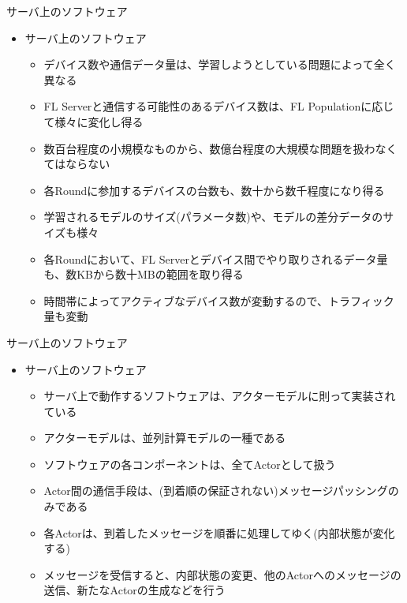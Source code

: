 \documentclass[dvipdfmx,notheorems,t]{beamer}
\begin{document}
\begin{frame}{サーバ上のソフトウェア}

\begin{itemize}
	\item サーバ上のソフトウェア
	\begin{itemize}
		\item デバイス数や通信データ量は、学習しようとしている問題によって全く異なる
		\newline
		
		\item FL Serverと通信する可能性のあるデバイス数は、FL Populationに応じて様々に変化し得る
		\item \alert{数百台}程度の小規模なものから、\alert{数億台}程度の大規模な問題を扱わなくてはならない
		\item 各Roundに参加するデバイスの台数も、\alert{数十}から\alert{数千}程度になり得る
		\newline
		
		\item 学習されるモデルのサイズ(パラメータ数)や、モデルの差分データのサイズも様々
		\item 各Roundにおいて、FL Serverとデバイス間でやり取りされるデータ量も、\alert{数KB}から\alert{数十MB}の範囲を取り得る
		\newline
		
		\item 時間帯によってアクティブなデバイス数が変動するので、トラフィック量も変動
	\end{itemize}
\end{itemize}

\end{frame}

\begin{frame}{サーバ上のソフトウェア}

\begin{itemize}
	\item サーバ上のソフトウェア
	\begin{itemize}
		\item サーバ上で動作するソフトウェアは、\alert{アクターモデル}に則って実装されている
		\item アクターモデルは、並列計算モデルの一種である
		\newline
		
		\item ソフトウェアの各コンポーネントは、全て\alert{Actor}として扱う
		\item Actor間の通信手段は、(到着順の保証されない)\alert{メッセージパッシング}のみである
		\newline
		
		\item 各Actorは、到着したメッセージを順番に処理してゆく(内部状態が変化する)
		\item メッセージを受信すると、内部状態の変更、他のActorへのメッセージの送信、新たなActorの生成などを行う
	\end{itemize}
\end{itemize}

\end{frame}
\end{document}
